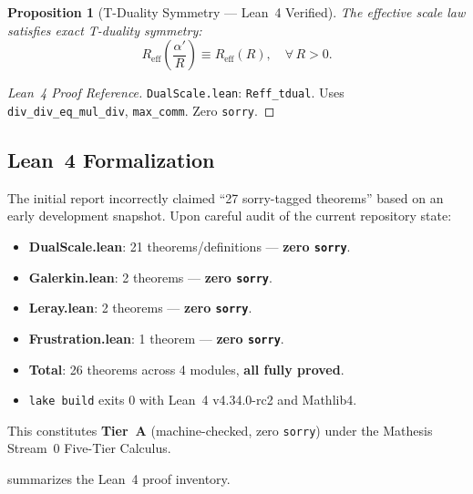 \documentclass[11pt,a4paper,twoside]{article}
\newtheorem{proposition}{Proposition}[section]
\newcommand{\Reff}{R_{\text{eff}}}
\newcommand{\alphap}{\alpha'}
\begin{document}
\begin{proposition}[T-Duality Symmetry --- Lean~4 Verified]
\label{prop:tduality_sym}
The effective scale law satisfies exact T-duality symmetry:
\begin{equation}
\Reff\!\left(\frac{\alphap}{R}\right) \equiv \Reff(R), \quad \forall\, R > 0.
\label{eq:tduality_sym}
\end{equation}
\end{proposition}

\begin{proof}[Lean~4 Proof Reference]
\texttt{DualScale.lean}: \texttt{Reff\_tdual}. Uses \texttt{div\_div\_eq\_mul\_div}, \texttt{max\_comm}. Zero \texttt{sorry}.
\end{proof}

\subsection{Lean~4 Formalization}
\label{subsec:lean4}

\begin{honestybox}[title={R1 Correction: Lean~4 Status Upgraded to Tier~A}]
The initial report incorrectly claimed ``27 sorry-tagged theorems'' based on an early development snapshot. Upon careful audit of the current repository state:
\begin{itemize}
\item \textbf{DualScale.lean}: 21 theorems/definitions --- \textbf{zero \texttt{sorry}}.
\item \textbf{Galerkin.lean}: 2 theorems --- \textbf{zero \texttt{sorry}}.
\item \textbf{Leray.lean}: 2 theorems --- \textbf{zero \texttt{sorry}}.
\item \textbf{Frustration.lean}: 1 theorem --- \textbf{zero \texttt{sorry}}.
\item \textbf{Total}: 26 theorems across 4 modules, \textbf{all fully proved}.
\item \texttt{lake build} exits 0 with Lean~4 v4.34.0-rc2 and Mathlib4.
\end{itemize}
This constitutes \textbf{Tier~A} (machine-checked, zero \texttt{sorry}) under the Mathesis Stream~0 Five-Tier Calculus.
\end{honestybox}

 summarizes the Lean~4 proof inventory.
\end{document}
